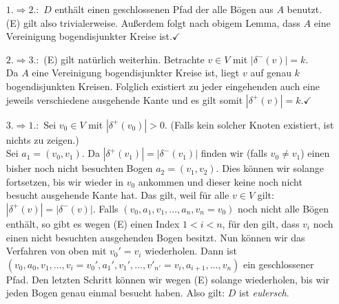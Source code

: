 \documentclass[a4paper,10pt,german]{scrartcl}
\newcommand{\ra}{\Rightarrow}
\begin{document}
\begin{itemize}
  \itemindent=20pt
  \item[$1. \ra 2.:$] $D$ enthält einen geschlossenen Pfad der alle Bögen aus $A$ benutzt. 
  (E) gilt also trivialerweise. Außerdem folgt nach obigem Lemma, dass $A$ eine Vereinigung 
  bogendisjunkter Kreise ist.\hfill $\checkmark$ 
  \item[$2. \ra 3.:$](E) gilt natürlich weiterhin. Betrachte $v\in V$ mit $|\delta^-(v)|=k$.\\
  Da $A$ eine Vereinigung bogendisjunkter Kreise ist, liegt $v$ auf genau $k$ bogendisjunkten Kreisen. Folglich existiert zu jeder eingehenden auch eine jeweils verschiedene ausgehende Kante und es gilt somit $|\delta^+(v)|=k$.\hfill$\checkmark$
  \item[$3. \ra 1.:$] Sei $v_0\in V$ mit $|\delta^+(v_0)|>0$. (Falls kein solcher Knoten existiert, ist nichts zu zeigen.)\\
  Sei $a_1=(v_0,v_1)$. Da $|\delta^+(v_1)|=|\delta^-(v_1)|$ finden wir (falls $v_0\neq v_1$) einen bisher noch nicht besuchten Bogen $a_2=(v_1,v_2)$. Dies können wir solange fortsetzen, bis wir wieder in $v_0$ ankommen und dieser keine noch nicht besucht ausgehende Kante hat. Das gilt, weil für alle $v\in V$ gilt:\,$|\delta^+(v)|=|\delta^-(v)|$. Falls $(v_0,a_1,v_1,\dots,a_n,v_n=v_0)$ noch nicht alle Bögen enthält, so gibt es wegen (E) einen Index $1<i<n$, für den gilt, dass $v_i$ noch einen nicht besuchten ausgehenden Bogen besitzt. Nun können wir das Verfahren von oben mit $v_0'=v_i$ wiederholen. Dann ist $(v_0,a_0,v_1,\dots,v_i=v_0',a_1',v_1',\dots,v'_{n'}=v_i,a_{i+1},\dots,v_n)$ ein geschlossener Pfad. Den letzten Schritt können wir wegen (E) solange wiederholen, bis wir jeden Bogen genau einmal besucht haben. Also gilt: $D$ ist \emph{eulersch}.

\end{itemize}
\end{document}
